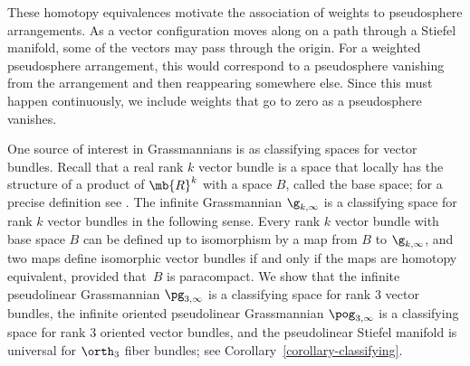 These homotopy equivalences motivate the association of weights to pseudosphere arrangements.
As a vector configuration moves along on a path through a Stiefel manifold, some of the vectors may pass through the origin. For a weighted pseudosphere arrangement, this would correspond to a pseudosphere vanishing from the arrangement and then reappearing somewhere else. Since this must happen continuously, we include weights that go to zero as a pseudosphere vanishes.

One source of interest in Grassmannians is as classifying spaces for vector bundles.
Recall that a real rank $k$ vector bundle is a space that locally has the structure of a product of $\mb{R}^k$ with a space $B$, called the base space; for a precise definition see \cite[p.\,24]{husemoller1994fibre}.
The infinite Grassmannian $\g_{k,\infty}$ is a classifying space for rank $k$ vector bundles in the following sense.
Every rank $k$ vector bundle with base space $B$ can be defined up to isomorphism by a map from $B$ to $\g_{k,\infty}$, and two maps define isomorphic vector bundles if and only if the maps are homotopy equivalent, provided that~$B$ is paracompact.
We show that the infinite pseudolinear Grassmannian $\pg_{3,\infty}$ is a classifying space for rank $3$ vector bundles, the infinite oriented pseudolinear Grassmannian $\pog_{3,\infty}$ is a classifying space for rank $3$ oriented vector bundles, and the pseudolinear Stiefel manifold is universal for $\orth_3$ fiber bundles; see Corollary~\ref{corollary-classifying}.

